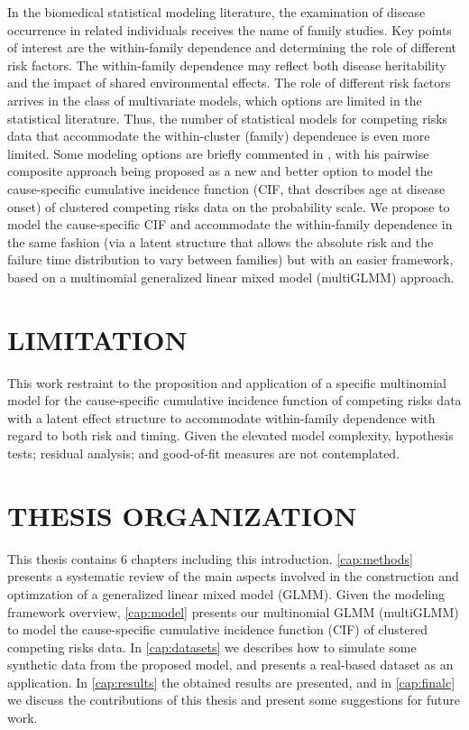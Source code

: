 In the biomedical statistical modeling literature, the examination of
disease occurrence in related individuals receives the name of family
studies. Key points of interest are the within-family dependence and
determining the role of different risk factors. The within-family
dependence may reflect both disease heritability and the impact of
shared environmental effects. The role of different risk factors arrives
in the class of multivariate models, which options are limited in the
statistical literature. Thus, the number of statistical models for
competing risks data that accommodate the within-cluster (family)
dependence is even more limited. Some modeling options are briefly
commented in , with his pairwise composite approach
being proposed as a new and better option to model the cause-specific
cumulative incidence function (CIF, that describes age at disease onset)
of clustered competing risks data on the probability scale. We propose
to model the cause-specific CIF and accommodate the within-family
dependence in the same fashion (via a latent structure that allows the
absolute risk and the failure time distribution to vary between
families) but with an easier framework, based on a multinomial
generalized linear mixed model (multiGLMM) approach.

\section{LIMITATION}

This work restraint to the proposition and application of a specific
multinomial model for the cause-specific cumulative incidence function
of competing risks data with a latent effect structure to accommodate
within-family dependence with regard to both risk and timing. Given the
elevated model complexity, hypothesis tests; residual analysis; and
good-of-fit measures are not contemplated.

\section{THESIS ORGANIZATION}

This thesis contains 6 chapters including this introduction.
\autoref{cap:methods} presents a systematic review of the main aspects
involved in the construction and optimzation of a generalized linear
mixed model (GLMM). Given the modeling framework overview,
\autoref{cap:model} presents our multinomial GLMM (multiGLMM) to model
the cause-specific cumulative incidence function (CIF) of clustered
competing risks data. In \autoref{cap:datasets} we describes how to
simulate some synthetic data from the proposed model, and presents a
real-based dataset as an application. In \autoref{cap:results} the
obtained results are presented, and in \autoref{cap:finalc} we discuss
the contributions of this thesis and present some suggestions for future
work.

